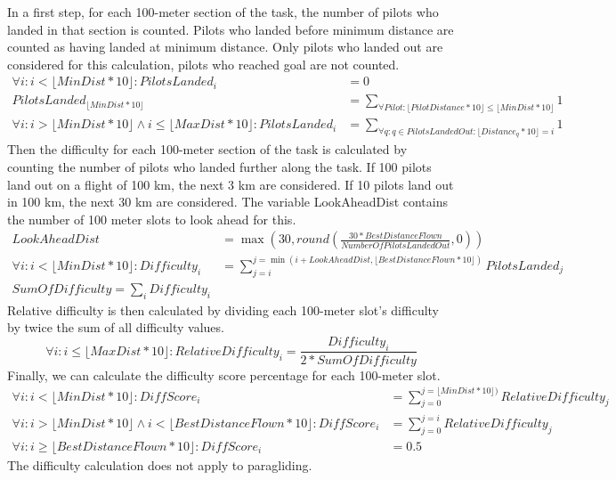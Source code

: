 \documentclass{article}
\begin{document}
In a first step, for each 100-meter section of the task, the number of pilots who landed in that section is
counted. Pilots who landed before minimum distance are counted as having landed at minimum
distance. Only pilots who landed out are considered for this calculation, pilots who reached goal are not
counted.
\begin{align*}
    \forall i : i < \lfloor MinDist * 10 \rfloor : PilotsLanded_i &= 0 \\
    PilotsLanded_{\lfloor MinDist * 10 \rfloor} &= \sum_{\forall Pilot : \lfloor PilotDistance * 10 \rfloor \leq \lfloor MinDist * 10 \rfloor} 1 \\
    \forall i : i > \lfloor MinDist * 10 \rfloor \land i \leq \lfloor MaxDist * 10 \rfloor : PilotsLanded_i &= \sum_{\forall q : q \in PilotsLandedOut : \lfloor Distance_q * 10 \rfloor = i} 1
\end{align*}
Then the difficulty for each 100-meter section of the task is calculated by counting the number of pilots
who landed further along the task. If 100 pilots land out on a flight of 100 km, the next 3 km are
considered. If 10 pilots land out in 100 km, the next 30 km are considered. The variable LookAheadDist
contains the number of 100 meter slots to look ahead for this.
\begin{align*}
    LookAheadDist &= \max(30, round(\frac{30 * BestDistanceFlown}{NumberOfPilotsLandedOut}, 0)) \\
    \forall i : i < \lfloor MinDist * 10 \rfloor : Difficulty_i &= \sum_{j = i}^{j = \min(i + LookAheadDist, \lfloor BestDistanceFlown * 10 \rfloor)} PilotsLanded_j \\
    SumOfDifficulty = \sum_i Difficulty_i
\end{align*}
Relative difficulty is then calculated by dividing each 100-meter slot’s difficulty by twice the sum of all
difficulty values.
\[ \forall i : i \leq \lfloor MaxDist * 10 \rfloor : RelativeDifficulty_i = \frac{Difficulty_i}{2 * SumOfDifficulty} \]
Finally, we can calculate the difficulty score percentage for each 100-meter slot.
\begin{align*}
    \forall i : i < \lfloor MinDist * 10 \rfloor : DiffScore_i &= \sum_{j = 0}^{j = \lfloor MinDist * 10 \rfloor)} RelativeDifficulty_j \\
    \forall i : i > \lfloor MinDist * 10 \rfloor \land i < \lfloor BestDistanceFlown * 10 \rfloor : DiffScore_i &= \sum_{j = 0}^{j = i} RelativeDifficulty_j \\
    \forall i : i \geq \lfloor BestDistanceFlown * 10 \rfloor : DiffScore_i &= 0.5
\end{align*}
The difficulty calculation does not apply to paragliding.
\end{document}
